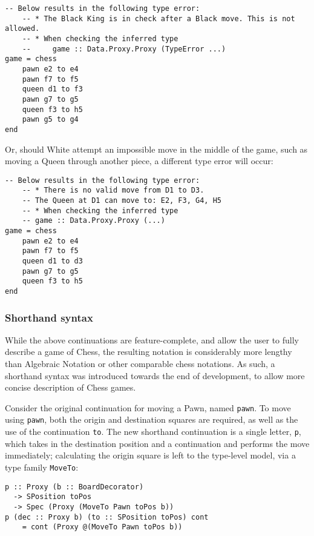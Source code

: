\documentclass[12pt, a4paper, bibliography=totocnumbered]{scrreprt}
\newcommand{\inline}[1]{\lstinline[basicstyle=\ttfamily\footnotesize]{#1}}
\begin{document}
\begin{lstlisting}
-- Below results in the following type error:
    -- * The Black King is in check after a Black move. This is not allowed.
    -- * When checking the inferred type
    --     game :: Data.Proxy.Proxy (TypeError ...)
game = chess
    pawn e2 to e4
    pawn f7 to f5
    queen d1 to f3
    pawn g7 to g5
    queen f3 to h5
    pawn g5 to g4
end
\end{lstlisting}

Or, should White attempt an impossible move in the middle of the game, such as moving a Queen through another piece, a different type error will occur:

\begin{lstlisting}
-- Below results in the following type error:
    -- * There is no valid move from D1 to D3.
    -- The Queen at D1 can move to: E2, F3, G4, H5
    -- * When checking the inferred type
    -- game :: Data.Proxy.Proxy (...)
game = chess
    pawn e2 to e4
    pawn f7 to f5
    queen d1 to d3
    pawn g7 to g5
    queen f3 to h5
end
\end{lstlisting}

\subsubsection{Shorthand syntax} \label{shorthandexplanation}

While the above continuations are feature-complete, and allow the user to fully describe a game of Chess, the resulting notation is considerably more lengthy than Algebraic Notation or other comparable chess notations. As such, a shorthand syntax was introduced towards the end of development, to allow more concise description of Chess games.

Consider the original continuation for moving a Pawn, named \inline{pawn}. To move using \inline{pawn}, both the origin and destination squares are required, as well as the use of the continuation \inline{to}. The new shorthand continuation is a single letter, \inline{p}, which takes in the destination position and a continuation and performs the move immediately; calculating the origin square is left to the type-level model, via a type family \inline{MoveTo}:

\begin{lstlisting}
p :: Proxy (b :: BoardDecorator)
  -> SPosition toPos
  -> Spec (Proxy (MoveTo Pawn toPos b))
p (dec :: Proxy b) (to :: SPosition toPos) cont
    = cont (Proxy @(MoveTo Pawn toPos b))
\end{lstlisting}
\end{document}
